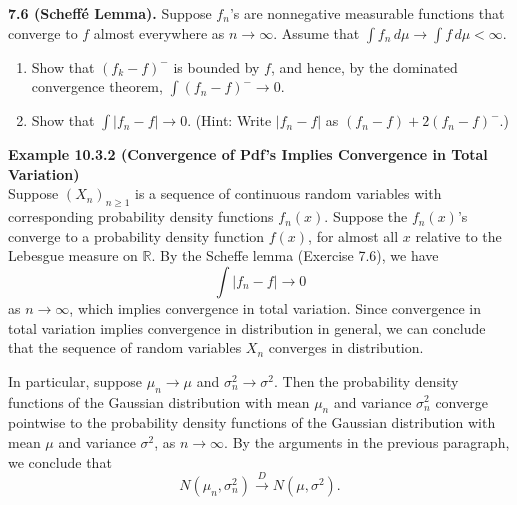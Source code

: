 \textbf{7.6 (Scheff\'e Lemma).} Suppose $f_n$'s are nonnegative measurable functions that converge to $f$ almost everywhere as $n\to\infty$. Assume that $\int f_n\, d\mu \to \int f\, d\mu < \infty$.
\begin{enumerate}[label=(\alph*)]
    \item Show that $(f_k-f)^-$ is bounded by $f$, and hence, by the dominated convergence theorem, $\int (f_n-f)^- \to 0$.
    \item Show that $\int |f_n-f|\to 0$. (Hint: Write $|f_n-f|$ as $(f_n-f)+2(f_n-f)^-$.)
\end{enumerate}

\textbf{Example 10.3.2 (Convergence of Pdf's Implies Convergence in Total Variation)} \\
Suppose $(X_n)_{n\geq 1}$ is a sequence of continuous random variables with corresponding probability density functions $f_n(x)$. Suppose the $f_n(x)$'s converge to a probability density function $f(x)$, for almost all $x$ relative to the Lebesgue measure on $\mathbb{R}$. By the Scheffe lemma (Exercise 7.6), we have
\[
\int \lvert f_n-f\rvert\to 0
\]
as $n\to\infty$, which implies convergence in total variation. Since convergence in total variation implies convergence in distribution in general, we can conclude that the sequence of random variables $X_n$ converges in distribution.

In particular, suppose $\mu_n\to\mu$ and $\sigma_n^2\to\sigma^2$. Then the probability density functions of the Gaussian distribution with mean $\mu_n$ and variance $\sigma_n^2$ converge pointwise to the probability density functions of the Gaussian distribution with mean $\mu$ and variance $\sigma^2$, as $n\to\infty$. By the arguments in the previous paragraph, we conclude that
\[
N(\mu_n,\sigma_n^2)\xrightarrow{D}N(\mu,\sigma^2).
\]
